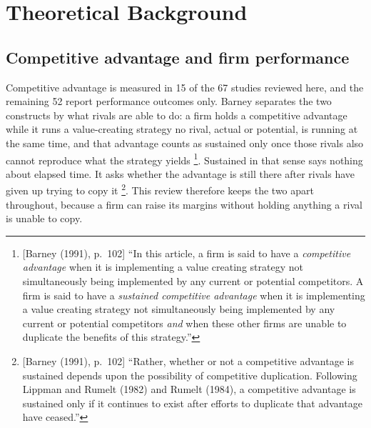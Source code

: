 \chapter{Theoretical Background}
\label{sec:background}


\section{Competitive advantage and firm performance}
\label{sec:constructs}

Competitive advantage is measured in 15 of the 67 studies reviewed here, and the
remaining 52 report performance outcomes only. Barney separates the two constructs by
what rivals are able to do: a firm holds a competitive advantage while it runs a
value-creating strategy no rival, actual or potential, is running at the same time, and
that advantage counts as sustained only once those rivals also cannot reproduce what the
strategy yields \parencite[p.~102]{barney1991firm}\footnote{[Barney (1991), p.~102] ``In
this article, a firm is said to have a \emph{competitive advantage} when it is
implementing a value creating strategy not simultaneously being implemented by any current
or potential competitors. A firm is said to have a \emph{sustained competitive advantage}
when it is implementing a value creating strategy not simultaneously being implemented by
any current or potential competitors \emph{and} when these other firms are unable to
duplicate the benefits of this strategy.''}. Sustained in that sense says nothing about
elapsed time. It asks whether the advantage is still there after rivals have given up
trying to copy it \parencite[p.~102]{barney1991firm}\footnote{[Barney (1991), p.~102]
``Rather, whether or not a competitive advantage is sustained depends upon the possibility
of competitive duplication. Following Lippman and Rumelt (1982) and Rumelt (1984), a
competitive advantage is sustained only if it continues to exist after efforts to
duplicate that advantage have ceased.''}. This review therefore keeps the two apart
throughout, because a firm can raise its margins without holding anything a rival is
unable to copy.

